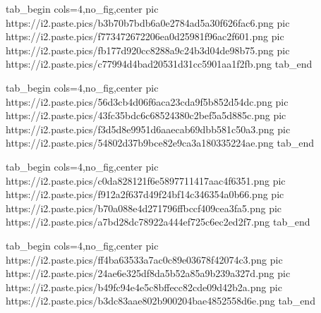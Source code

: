  
 
 
 
 
\zzSecCmtScr

\ifcmt
  tab_begin cols=4,no_fig,center
     pic https://i2.paste.pics/b3b70b7bdb6a0e2784ad5a30f626fac6.png
		 pic https://i2.paste.pics/f773472672206ea0d25981f96ac2f601.png
		 pic https://i2.paste.pics/fb177d920cc8288a9c24b3d04de98b75.png
		 pic https://i2.paste.pics/c77994d4bad20531d31cc5901aa1f2fb.png
  tab_end
\fi

\ifcmt
  tab_begin cols=4,no_fig,center
	   pic https://i2.paste.pics/56d3cb4d06f6aca23cda9f5b852d54dc.png
		 pic https://i2.paste.pics/43fc35bdc6c68524380c2bef5a5d885c.png
		 pic https://i2.paste.pics/f3d5d8e9951d6aaecab69dbb581c50a3.png
		 pic https://i2.paste.pics/54802d37b9bce82e9ca3a180335224ae.png
  tab_end
\fi

\ifcmt
  tab_begin cols=4,no_fig,center
		pic https://i2.paste.pics/c0da828121f6e5897711417aac4f6351.png
		pic https://i2.paste.pics/f912a2f637d49f24bf14c346354a0b66.png
		pic https://i2.paste.pics/b70a088e4d271796ffbccf409cea3fa5.png
		pic https://i2.paste.pics/a7bd28dc78922a444ef725c6ec2ed2f7.png
  tab_end
\fi

\ifcmt
  tab_begin cols=4,no_fig,center
		 pic https://i2.paste.pics/ff4ba63533a7ac0c89e03678f42074c3.png
		 pic https://i2.paste.pics/24ae6e325df8da5b52a85a9b239a327d.png
		 pic https://i2.paste.pics/b49fc94e4e5c8bffecc82cde09d42b2a.png
		 pic https://i2.paste.pics/b3dc83aae802b900204bae4852558d6e.png
  tab_end
\fi
